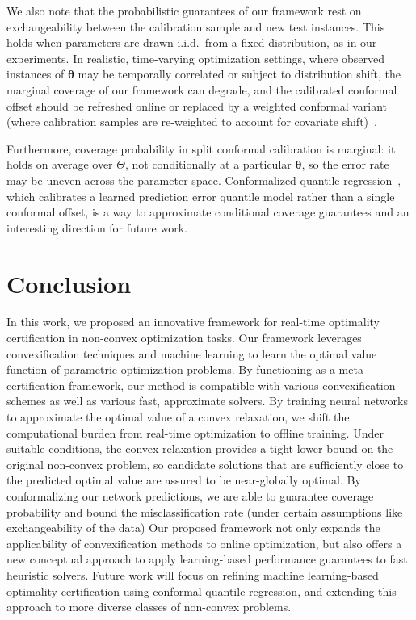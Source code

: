 \documentclass[10pt]{article} %
\theoremstyle{plain}
\theoremstyle{definition}
\theoremstyle{remark}
\begin{document}
We also note that the probabilistic guarantees of our framework rest on exchangeability between the calibration sample and new test instances. This holds when parameters are drawn i.i.d.\ from a fixed distribution, as in our experiments.
In realistic, time-varying optimization settings, where observed instances of $\bm{\theta}$ may be temporally correlated or subject to distribution shift, the marginal coverage of our framework can degrade, and the calibrated conformal offset should be refreshed online or replaced by a weighted conformal variant (where calibration samples are re-weighted to account for covariate shift)~\citep{tibshirani2019conformal}.

Furthermore, coverage probability in split conformal calibration is marginal: it holds on average over $\Theta$, not conditionally at a particular $\bm{\theta}$, so the error rate may be uneven across the parameter space. Conformalized quantile regression~\citep{romano2019conformalized}, which calibrates a learned prediction error quantile model rather than a single conformal offset, is a way to approximate conditional coverage guarantees and an interesting direction for future work.

\section{Conclusion} \label{sec:conclusion}
In this work, we proposed an innovative framework for real-time optimality certification in non-convex optimization tasks.
Our framework leverages convexification techniques and machine learning to learn the optimal value function of parametric optimization problems.
By functioning as a meta-certification framework, our method is compatible with various convexification schemes as well as various fast, approximate solvers. 
By training neural networks to approximate the optimal value of a convex relaxation, we shift the computational burden from real-time optimization to offline training. 
Under suitable conditions, the convex relaxation provides a tight lower bound on the original non-convex problem, so candidate solutions that are sufficiently close to the predicted optimal value are assured to be near-globally optimal.
By conformalizing our network predictions, we are able to guarantee coverage probability and bound the misclassification rate (under certain assumptions like exchangeability of the data)
Our proposed framework not only expands the applicability of convexification methods to online optimization, but also offers a new conceptual approach to apply learning-based performance guarantees to fast heuristic solvers.
Future work will focus on refining machine learning-based optimality certification using conformal quantile regression, and extending this approach to more diverse classes of non-convex problems.
\end{document}
